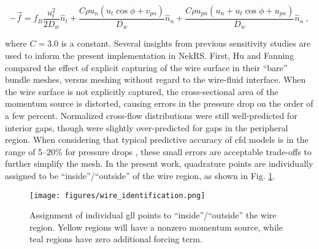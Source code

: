 \documentclass[3p,,preprint,11pt]{elsarticle}
\let\gt=>
\begin{document}
\begin{equation}
\label{eq:msm2}
-\vec{f}= f_{B}\frac{u_t^2}{2D_w}\hat{n}_t+\frac{C\rho u_n\left(u_t\cos{\phi}+v_{pn}\right)}{D_w}\hat{n}_n+\frac{C\rho u_{pn}\left(u_n+u_t\cos{\phi}+u_{pn}\right)}{D_w}\hat{n}_n\ ,
\end{equation}


\noindent where $C=3.0$ is a constant. 
Several insights from previous sensitivity studies \cite{hu2013} are used to inform the present
implementation in NekRS. 
First, Hu and Fanning compared the effect of explicit capturing of
the wire surface in their ``bare'' bundle meshes, versus meshing without regard to the wire-fluid interface. 
When the wire surface is not explicitly captured, the cross-sectional area of the momentum source is distorted, causing errors in the pressure drop on the order of a few percent. 
Normalized cross-flow distributions were still well-predicted for interior gaps,
though were slightly over-predicted for gaps in the peripheral region. 
When considering that typical predictive accuracy of \gls{cfd} models is in the range of 5--20\% for pressure drops
\cite{mays,hamman,martin2020,brockmeyer}, these small errors are
acceptable trade-offs to further simplify the mesh.
In the present work, quadrature points
are individually assigned to be ``inside''/``outside'' of the wire region, as shown in Fig. \ref{fig:wire_identification}.

\begin{figure}[!htb]                                                                                                  
\centering
\texttt{[image: figures/wire\_identification.png]}
\caption{Assignment of individual \gls{gll} points to ``inside''/``outside'' the wire region. Yellow regions will have a nonzero momentum source, while teal regions have zero additional forcing term.}
\label{fig:wire_identification}
\end{figure}
\end{document}

